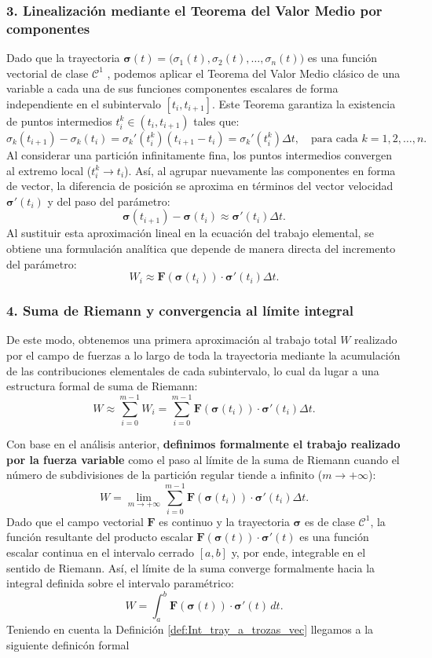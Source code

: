 \subsubsection*{3. Linealización mediante el Teorema del Valor Medio por componentes} 
Dado que la trayectoria $\boldsymbol{\sigma}(t) = \big(\sigma_1(t), \sigma_2(t), \dots, \sigma_n(t)\big)$ es una función vectorial de clase  $\mathcal{C}^1$ , podemos aplicar el Teorema del Valor Medio clásico de una variable a cada una de sus funciones componentes escalares de forma independiente en el subintervalo $[t_i, t_{i+1}]$. Este Teorema garantiza la existencia de puntos intermedios $t^k_i \in (t_i, t_{i+1})$ tales que:
\[
\sigma_k(t_{i+1}) - \sigma_k(t_i) = \sigma_k'(t^k_i)(t_{i+1} - t_i) = \sigma_k'(t^k_i) \Delta t, \quad \text{para cada } k = 1, 2, \dots, n.
\]
Al considerar una partición infinitamente fina, los puntos intermedios convergen al extremo local ($t^k_i \to t_i$). Así, al agrupar nuevamente las componentes en forma de vector, la diferencia de posición se aproxima en términos del vector velocidad $\boldsymbol{\sigma}'(t_i)$ y del paso del parámetro:
\[ 
\boldsymbol{\sigma}(t_{i+1}) - \boldsymbol{\sigma}(t_i) \approx \boldsymbol{\sigma}'(t_i) \Delta t. 
\] 
Al sustituir esta aproximación lineal en la ecuación del trabajo elemental, se obtiene una formulación analítica que depende de manera directa del incremento del parámetro: 
\[ 
W_i \approx \mathbf{F}(\boldsymbol{\sigma}(t_i)) \cdot \boldsymbol{\sigma}'(t_i) \Delta t. 
\] 


\subsubsection*{4. Suma de Riemann y convergencia al límite integral} 
De este modo, obtenemos una primera aproximación al trabajo total $W$ realizado por el campo de fuerzas a lo largo de toda la trayectoria mediante la acumulación de las contribuciones elementales de cada subintervalo, lo cual da lugar a una estructura formal de suma de Riemann: 
\[ 
W \approx \sum_{i=0}^{m-1} W_i = \sum_{i=0}^{m-1} \mathbf{F}(\boldsymbol{\sigma}(t_i)) \cdot \boldsymbol{\sigma}'(t_i) \Delta t. 
\] 

Con base en el análisis anterior, \textbf{definimos formalmente el trabajo realizado por la fuerza variable} como el paso al límite de la suma de Riemann cuando el número de subdivisiones de la partición regular tiende a infinito ($m \to +\infty$): 
\[ 
W = \lim_{m \to +\infty} \sum_{i=0}^{m-1} \mathbf{F}(\boldsymbol{\sigma}(t_i)) \cdot \boldsymbol{\sigma}'(t_i) \Delta t. 
\] 
Dado que el campo vectorial $\mathbf{F}$ es continuo y la trayectoria $\boldsymbol{\sigma}$ es de clase $\mathcal{C}^1$, la función resultante del producto escalar $\mathbf{F}(\boldsymbol{\sigma}(t)) \cdot \boldsymbol{\sigma}'(t)$ es una función escalar continua en el intervalo cerrado $[a,b]$ y, por ende, integrable en el sentido de Riemann. Así, el límite de la suma converge formalmente hacia la integral definida sobre el intervalo paramétrico: 
\[ 
W = \int_a^b \mathbf{F}(\boldsymbol{\sigma}(t)) \cdot \boldsymbol{\sigma}'(t) \, dt. \tag*{$\blacksquare$}
\]
Teniendo en cuenta la Definición \ref{def:Int_tray_a_trozas_vec}  llegamos a la siguiente definic\'on formal

